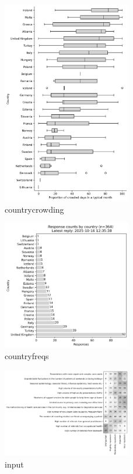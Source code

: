 \documentclass{article}
\begin{document}
\lipsum[1]

\begin{figure}[H]
    \centering
        \includegraphics[width=0.5\textwidth]{country_crowding}
        \caption{countrycrowding}
        \label{fig:country_crowding}
\end{figure}

\begin{figure}[H]
    \centering
        \includegraphics[width=0.5\textwidth]{country_freqs}
        \caption{countryfreqs}
        \label{fig:country_freqs}
\end{figure}

\begin{figure}[H]
    \centering
        \includegraphics[width=0.5\textwidth]{input}
        \caption{input}
        \label{fig:input}
\end{figure}
\end{document}
